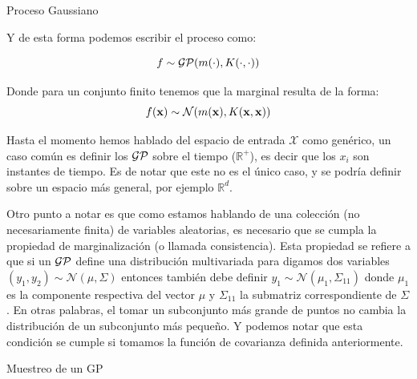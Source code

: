 \documentclass[9pt]{beamer}
\begin{document}
\begin{frame}{Proceso Gaussiano}

Y de esta forma podemos escribir el proceso como: \pause 

\begin{equation*}
  f \sim \mathcal{GP}(m(\cdot), K(\cdot, \cdot))
\end{equation*}  \pause 

Donde para un conjunto finito tenemos que la marginal resulta de la forma:
\pause
\begin{equation*}
  f(\mathbf{x}) \sim \mathcal{N}(m(\mathbf{x}), K(\mathbf{x}, \mathbf{x}))
\end{equation*} \pause 



Hasta el momento hemos hablado del espacio de entrada $\mathcal{X}$ como genérico, un caso común es definir los $\mathcal{GP}$ sobre el tiempo ($\mathbb{R}^{+}$), es decir que los $x_i$ son instantes de tiempo. Es de notar que este no es el único caso, y se podría definir sobre un espacio más general, por ejemplo $\mathbb{R}^d$. \pause

\vspace{0.2cm}

Otro punto a notar es que como estamos hablando de una colección (no necesariamente finita) de variables aleatorias, es necesario que se cumpla la propiedad de marginalización (o llamada consistencia). Esta propiedad se refiere a que si un $\mathcal{GP}$ define una distribución multivariada para digamos dos variables $(y_1, y_2) \sim \mathcal{N}(\mu, \Sigma)$ entonces también debe definir $y_1 \sim \mathcal{N}(\mu_1, \Sigma_{11})$ donde $\mu_1$ es la componente respectiva del vector $\mu$ y $\Sigma_{11}$ la submatriz correspondiente de $\Sigma$. En otras palabras, el tomar un subconjunto más grande de puntos no cambia la distribución de un subconjunto más pequeño. Y podemos notar que esta condición se cumple si tomamos la función de covarianza definida anteriormente.

\begin{frame}{Muestreo de un GP}


\end{frame}


\end{frame}

\begin{frame}
  \titlepage
\end{frame}




%
\end{document}
